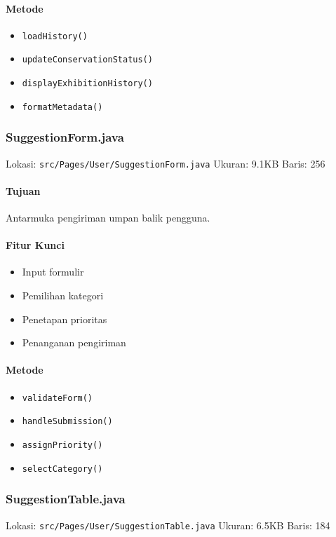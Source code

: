 \documentclass[12pt,a4paper]{article}
\begin{document}
\paragraph{Metode}
\begin{itemize}
    \item \texttt{loadHistory()}
    \item \texttt{updateConservationStatus()}
    \item \texttt{displayExhibitionHistory()}
    \item \texttt{formatMetadata()}
\end{itemize}

\subsubsection{SuggestionForm.java}
Lokasi: \texttt{src/Pages/User/SuggestionForm.java}
Ukuran: 9.1KB
Baris: 256

\paragraph{Tujuan}
Antarmuka pengiriman umpan balik pengguna.

\paragraph{Fitur Kunci}
\begin{itemize}
    \item Input formulir
    \item Pemilihan kategori
    \item Penetapan prioritas
    \item Penanganan pengiriman
\end{itemize}

\paragraph{Metode}
\begin{itemize}
    \item \texttt{validateForm()}
    \item \texttt{handleSubmission()}
    \item \texttt{assignPriority()}
    \item \texttt{selectCategory()}
\end{itemize}

\subsubsection{SuggestionTable.java}
Lokasi: \texttt{src/Pages/User/SuggestionTable.java}
Ukuran: 6.5KB
Baris: 184
\end{document}
